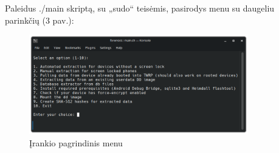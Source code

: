 \documentclass[a4paper,12pt,fleqn]{article}
\begin{document}
Paleidus ./main skriptą, su „sudo“ teisėmis, pasirodys menu su daugeliu parinkčių (3 pav.):

\begin{figure} [h]
    \centering
    \includegraphics[width=0.85\textwidth]{terminal.png}
    \caption{Įrankio pagrindinis menu}
    \label{fig:terminal}
\end{figure}
\end{document}
